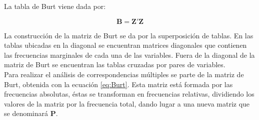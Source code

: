 \documentclass[mathematics,article,submit,moreauthors,pdftex]{mdpi}
\begin{document}
La tabla de Burt viene dada por:

\begin{equation}
\mathbf{B}=\mathbf{Z'}\mathbf{Z}
\label{eq:Burt}
\end{equation}

La construcción de la matriz de Burt se da por la superposición de
tablas. En las tablas ubicadas en la diagonal se encuentran matrices
diagonales que contienen las frecuencias marginales de cada una de las
variables. Fuera de la diagonal de la matriz de Burt se encuentran las
tablas cruzadas por pares de variables.\\
Para realizar el análisis de correspondencias múltiples se parte de la
matriz de Burt, obtenida con la ecuación \ref{eq:Burt}. Esta matriz está
formada por las frecuencias absolutas, éstas se transforman en
frecuencias relativas, dividiendo los valores de la matriz por la
frecuencia total, dando lugar a una nueva matriz que se denominará
\textbf{P}.
\end{document}
